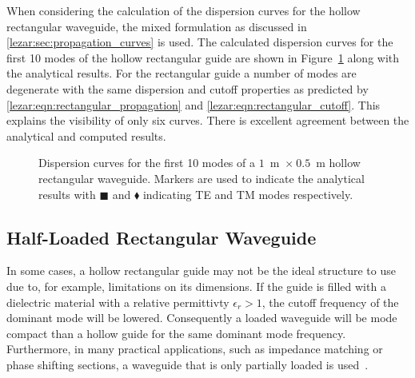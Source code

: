 When considering the calculation of the dispersion curves for the
hollow rectangular waveguide, the mixed formulation as discussed in
\ref{lezar:sec:propagation_curves} is used.  The calculated dispersion
curves for the first 10 modes of the hollow rectangular guide are
shown in Figure~\ref{lezar:fig:hollow_rectangular_dispersion_curves} along
with the analytical results. For the rectangular guide a number of
modes are degenerate with the same dispersion and cutoff properties as
predicted by \eqref{lezar:eqn:rectangular_propagation} and
\eqref{lezar:eqn:rectangular_cutoff}. This explains the visibility of only
six curves. There is excellent agreement between the analytical and
computed results.
\begin{figure}[h]
 \centering
 \caption{Dispersion curves for the first 10 modes of a $1$~m~$\times~0.5$~m hollow rectangular waveguide. Markers are used to indicate the analytical results with $\blacksquare$ and $\blacklozenge$ indicating TE and TM modes respectively.}
 \label{lezar:fig:hollow_rectangular_dispersion_curves}
\end{figure}
\subsection{Half-Loaded Rectangular Waveguide}
In some cases, a hollow rectangular guide may not be the ideal
structure to use due to, for example, limitations on its
dimensions. If the guide is filled with a dielectric material with a
relative permittivty $\epsilon_r > 1$, the cutoff frequency of the dominant
mode will be lowered. Consequently a loaded waveguide will be mode
compact than a hollow guide for the same dominant mode
frequency. Furthermore, in many practical applications, such as
impedance matching or phase shifting sections, a waveguide that is
only partially loaded is used~\cite{Poz2005}.

